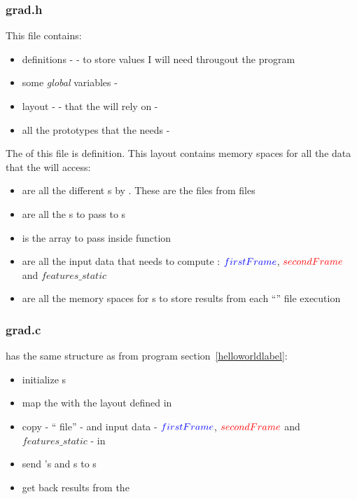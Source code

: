 \subsubsection{grad.h}

This file contains:
\begin{itemize}
	\item {} definitions -  - to store values I will need througout the program
	\item some \emph{global} variables - 
	\item \ram{} layout -  - that the  will rely on - 
	\item all the  prototypes that the \api{} needs - 
\end{itemize}

The  of this file is  definition. This layout contains \ram{} memory spaces for all the data that the \vc{} will access:
\begin{itemize}
	\item {} are all the different s by \vc{}. These are the  files from  files
	\item {} are all the \uni{}s to pass to \qpu{}s
	\item {} is the  array to pass inside  function
	\item {} are all the input data that \vc{} needs to compute \flow: $\textcolor{blue}{firstFrame}$, $\textcolor{red}{secondFrame}$ and $features\_static$
	\item {} are all the \ram{} memory spaces for \qpu{}s to store results from each \enquote{} file execution
\end{itemize}


\subsubsection{grad.c}\label{gradClbl}

 has the same structure as  from  program section~\ref{helloworldlabel}:
\begin{itemize}
	\item initialize \qpu{}s
	\item map the \ram{} with the layout defined in 
	\item copy  -  \enquote{ file} -  and input data - $\textcolor{blue}{firstFrame}$, $\textcolor{red}{secondFrame}$ and $features\_static$ - in \ram
	\item send 's  and \uni{}s to \qpu{}s
	\item get back results from the \ram
\end{itemize}

